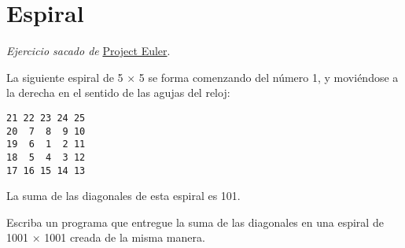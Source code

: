 \section{Espiral}

\emph{Ejercicio sacado de}
\href{http://projecteuler.net/index.php?section=problems\&id=28}{Project
Euler}.

La siguiente espiral de 5 × 5 se forma comenzando del número 1, y
moviéndose a la derecha en el sentido de las agujas del reloj:

\begin{lstlisting}
21 22 23 24 25
20  7  8  9 10
19  6  1  2 11
18  5  4  3 12
17 16 15 14 13
\end{lstlisting}

La suma de las diagonales de esta espiral es 101.

Escriba un programa que entregue la suma de las diagonales en una
espiral de 1001 × 1001 creada de la misma manera.
